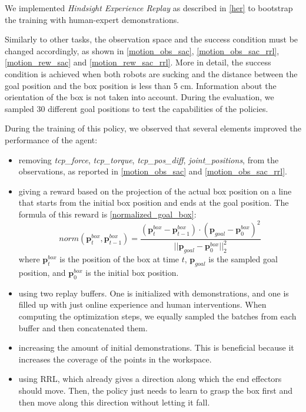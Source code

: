 \documentclass[letterpaper, 10 pt, conference]{ieeeconf}  %
\begin{document}
We implemented \textit{Hindsight Experience Replay} \cite{andrychowicz2018hindsightexperiencereplay} as described in \cref{her} to bootstrap the training with human-expert demonstrations.

Similarly to other tasks, the observation space and the success condition must be changed accordingly, as shown in \cref{motion_obs_sac}, \cref{motion_obs_sac_rrl}, \cref{motion_rew_sac} and \cref{motion_rew_sac_rrl}. More in detail, the success condition is achieved when both robots are sucking and the distance between the goal position and the box position is less than 5 cm. Information about the orientation of the box is not taken into account. During the evaluation, we sampled 30 different goal positions to test the capabilities of the policies.

During the training of this policy, we observed that several elements improved the performance of the agent:
\begin{itemize}
    \item removing \textit{tcp\_force}, \textit{tcp\_torque}, \textit{tcp\_pos\_diff}, \textit{joint\_positions}, from the observations, as reported in \cref{motion_obs_sac} and \cref{motion_obs_sac_rrl}.
    \item giving a reward based on the projection of the actual box position on a line that starts from the initial box position and ends at the goal position. The formula of this reward is \cref{normalized_goal_box}:
    \begin{equation}\label{normalized_goal_box}
        norm(\mathbf{p}^{box}_t, \mathbf{p}^{box}_{t-1}) = \frac{(\mathbf{p}^{box}_{t} - \mathbf{p}^{box}_{t-1})\cdot (\mathbf{p}_{goal} - \mathbf{p}^{box}_{0})^2}{||\mathbf{p}_{goal} - \mathbf{p}^{box}_{0}||^2_2}
    \end{equation}
    where $\mathbf{p}^{box}_t$ is the position of the box at time $t$, $\mathbf{p}_{goal}$ is the sampled goal position, and $\mathbf{p}^{box}_{0}$ is the initial box position.
    \item using two replay buffers. One is initialized with demonstrations, and one is filled up with just online experience and human interventions. When computing the optimization steps, we equally sampled the batches from each buffer and then concatenated them.
    \item increasing the amount of initial demonstrations. This is beneficial because it increases the coverage of the points in the workspace.
    \item using RRL, which already gives a direction along which the end effectors should move. Then, the policy just needs to learn to grasp the box first and then move along this direction without letting it fall.
\end{itemize}
\end{document}
